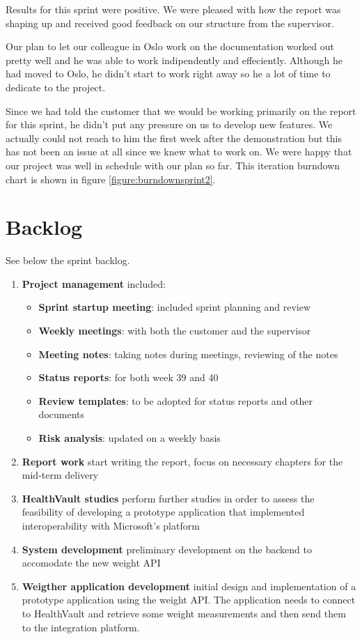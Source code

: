 Results for this sprint were positive. We were pleased with how the report was shaping up and
received good feedback on our structure from the supervisor.

Our plan to let our colleague in Oslo work on the documentation worked out pretty well
and he was able to work indipendently and effeciently. Although he had moved to Oslo,
he didn't start to work right away so he a lot of time to dedicate to the project.

Since we had told the customer that we would be working primarily on the report for this sprint,
he didn't put any pressure on us to develop new features. We actually could not reach to him
the first week after the demonstration but this has not been an issue at all since we
knew what to work on. We were happy that our project was well in schedule with our plan so far.
This iteration burndown chart is shown in figure \ref{figure:burndownsprint2}.

\clearpage
\section{Backlog}

See below the sprint backlog.
\begin{enumerate}[1.]
	\item \textbf{Project management} included:
	\begin{itemize}
		\item \textbf{Sprint startup meeting}:
			included sprint planning and review
		\item \textbf{Weekly meetings}:
			with both the customer and the supervisor
		\item \textbf{Meeting notes}:
			taking notes during meetings, reviewing of the notes
		\item \textbf{Status reports}:
			for both week 39 and 40
		\item \textbf{Review templates}:
			to be adopted for status reports and other documents
		\item \textbf{Risk analysis}:
			updated on a weekly basis
	\end{itemize}
	\item \textbf{Report work}\newline
		start writing the report, focus on necessary chapters for the mid-term delivery
	\item \textbf{HealthVault studies}\newline
		perform further studies in order to assess the feasibility of developing a prototype
		application that implemented interoperability with Microsoft's platform
	\item \textbf{System development}\newline
		preliminary development on the backend to accomodate the new weight API
	\item \textbf{Weigther application development}\newline
		initial design and implementation of a prototype application using the weight API.
		The application needs to connect to HealthVault and retrieve some weight measurements
		and then send them to the integration platform.
\end{enumerate}
